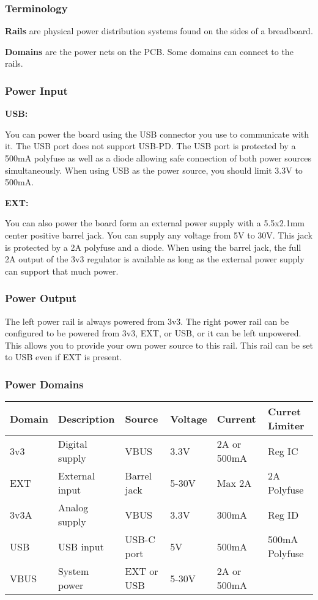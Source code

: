 \documentclass[12pt,letterpaper]{article}
\newcommand{\bolditem}[1]{
    \par
    \vspace{0.5em}
    \noindent\textbf{#1: }
}
\begin{document}
\subsubsection{Terminology}
\par\noindent
\textbf{Rails} are physical power distribution systems found on the sides of a breadboard.
\par\noindent
\textbf{Domains} are the power nets on the PCB. Some domains can connect to the rails.

\subsubsection{Power Input}
\bolditem{USB}
You can power the board using the USB connector you use to communicate with it. The USB port does not support USB-PD. The USB port is protected by a 500mA polyfuse as well as a diode allowing safe connection of both power sources simultaneously. When using USB as the power source, you should limit 3.3V to 500mA.
\bolditem{EXT}
You can also power the board form an external power supply with a 5.5x2.1mm center positive barrel jack. You can supply any voltage from 5V to 30V. This jack is protected by a 2A polyfuse and a diode. When using the barrel jack, the full 2A output of the 3v3 regulator is available as long as the external power supply can support that much power.

\subsubsection{Power Output}
The left power rail is always powered from 3v3. The right power rail can be configured to be powered from 3v3, EXT, or USB, or it can be left unpowered. This allows you to provide your own power source to this rail. This rail can be set to USB even if EXT is present.

\subsubsection{Power Domains}

\begin{table}[H]
    \centering
    \begin{tabular}{|llllll|}\hline
        Domain     & Description    & Source      & Voltage & Current     & Curret Limiter \\\hline
        3v3        & Digital supply & VBUS        & 3.3V    & 2A or 500mA & Reg IC         \\
        EXT        & External input & Barrel jack & 5-30V   & Max 2A      & 2A Polyfuse    \\
        3v3A       & Analog supply  & VBUS        & 3.3V    & 300mA       & Reg ID         \\
        USB        & USB input      & USB-C port  & 5V      & 500mA       & 500mA Polyfuse \\
        VBUS       & System power   & EXT or USB  & 5-30V   & 2A or 500mA &                \\\hline
    \end{tabular}
\end{table}
\end{document}
